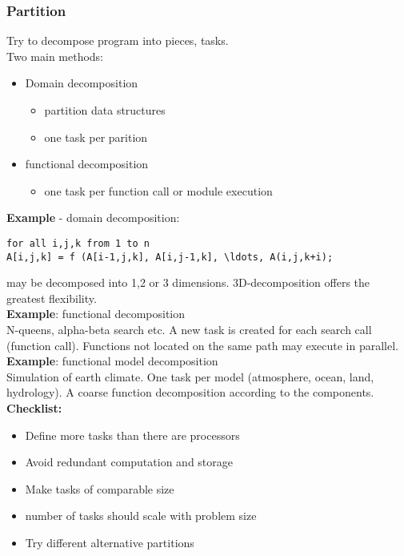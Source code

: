 \documentclass[a4paper]{article}
\begin{document}
\subsubsection{Partition}
Try to decompose program into pieces, tasks.\\
Two main methods:
\begin{itemize}
    \item Domain decomposition
        \begin{itemize}
            \item partition data structures
            \item one task per parition
        \end{itemize}
    \item functional decomposition
        \begin{itemize}
            \item one task per function call or module execution
        \end{itemize}
\end{itemize}
\textbf{Example} - domain decomposition:
\begin{verbatim}
for all i,j,k from 1 to n
A[i,j,k] = f (A[i-1,j,k], A[i,j-1,k], \ldots, A(i,j,k+i);
\end{verbatim}
may be decomposed into 1,2 or 3 dimensions. 3D-decomposition offers the greatest
flexibility.
\\\textbf{Example}: functional decomposition\\
N-queens, alpha-beta search etc. A new task is created for each search call
(function call). Functions not located on the same path may execute in parallel.
\\
\textbf{Example}: functional model decomposition\\
Simulation of earth climate. One task per model (atmosphere, ocean, land, hydrology).
A coarse function decomposition according to the components.
\\
\textbf{Checklist:}
\begin{itemize}
    \item Define more tasks than there are processors
    \item Avoid redundant computation and storage
    \item Make tasks of comparable size
    \item number of tasks should scale with problem size
    \item Try different alternative partitions
\end{itemize}
\end{document}
